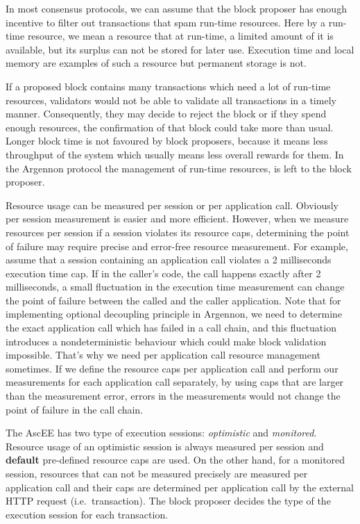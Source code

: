 In most consensus protocols, we can assume that the block proposer has enough incentive to filter out transactions
that spam run-time resources. Here by a run-time resource, we mean a resource that at run-time, a limited amount
of it is available, but its surplus can not be stored for later use. Execution time and local memory are
examples of such a resource but permanent storage is not.

If a proposed block contains many transactions which need a lot of run-time resources, validators would not
be able to validate all transactions in a timely manner. Consequently, they may decide to reject the block or if they
spend enough resources, the confirmation of that block could take more than usual. Longer block time is not
favoured by block proposers, because it means less throughput of the system which usually means less overall rewards
for them. In the Argennon protocol the management of run-time resources, is left to the block proposer.

Resource usage can be measured per session or per application call. Obviously per session measurement is
easier and more efficient. However, when we measure resources per session if
a session violates its resource caps, determining the point of failure may require precise and error-free resource
measurement. For example, assume that a session containing an application call
violates a 2 milliseconds execution time cap. If in the caller's code, the call happens exactly after 2 milliseconds,
a small fluctuation in the execution time measurement can
change the point of failure between the called and the caller application. Note that for implementing optional
decoupling principle in Argennon, we need to determine the
exact application call which has failed in a call chain, and this fluctuation introduces a nondeterministic
behaviour which could make block validation impossible. That's why we need per application call
resource management sometimes. If we define the resource caps per application call and
perform our measurements for each application call separately, by using caps that are larger than the measurement
error, errors in the measurements would not change the point of failure in the call chain.

The AscEE has two type of execution sessions: \emph{optimistic} and \emph{monitored}. Resource usage of an optimistic
session is always measured per session and \textbf{default} pre-defined resource caps are used. On the other hand, for a
monitored session, resources that can not be measured precisely are measured per application call and their caps are
determined per application call by the external HTTP request (i.e.\ transaction). The block proposer decides the
type of the execution session for each transaction.


